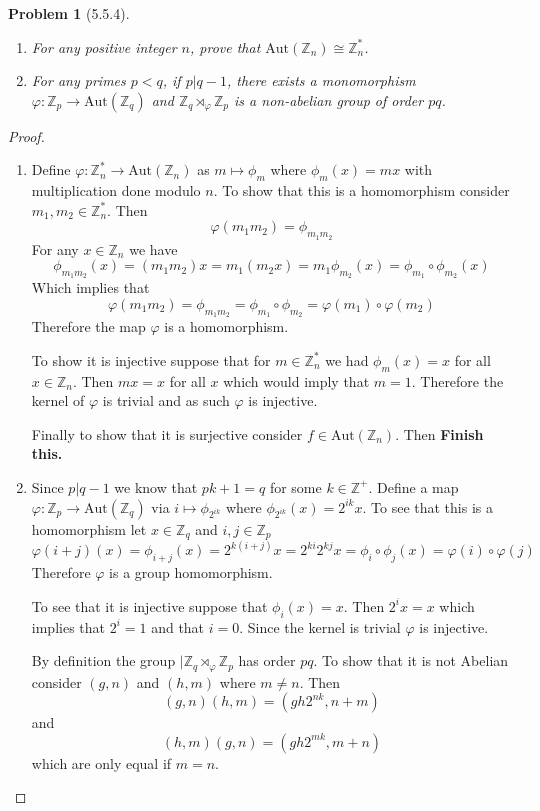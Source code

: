 \documentclass[10pt]{article}
\newcommand{\sk}{\vskip 10mm}
\newcommand{\bb}[1]{\mathbb{#1}}
\theoremstyle{plain}
\newtheorem{problem}{Problem}
\theoremstyle{remark}
\begin{document}
\sk

\begin{problem}[5.5.4]
  \begin{enumerate}
  \item[(a)] For any positive integer $n$, prove that $\text{Aut}(\bb{Z}_n)\cong \bb{Z}_n^*$.
  \item[(b)] For any primes $p<q$, if $p|q-1$, there exists a monomorphism
    $\varphi:\bb{Z}_p\rightarrow \text{Aut}(\bb{Z}_q)$ and $\bb{Z}_q\rtimes_\varphi \bb{Z}_p$ is a non-abelian
    group of order $pq$.
  \end{enumerate}
\end{problem}

\begin{proof}
  \begin{enumerate}
  \item[(a)] Define $\varphi:\bb{Z}_n^*\rightarrow \text{Aut}(\bb{Z}_n)$ as $m\mapsto \phi_m$ where $\phi_m(x)=mx$
    with multiplication done modulo $n$. To show that this is a homomorphism
    consider $m_1,m_2\in\bb{Z}_n^*$. Then
    \[ \varphi(m_1m_2)= \phi_{m_1m_2}\]
    For any $x\in \bb{Z}_n$ we have
    \[ \phi_{m_1m_2}(x)=(m_1m_2)x=m_1(m_2x)=m_1\phi_{m_2}(x)=\phi_{m_1}\circ\phi_{m_2}(x) \]
    Which implies that
    \[ \varphi(m_1m_2)=\phi_{m_1m_2}=\phi_{m_1}\circ\phi_{m_2}=\varphi(m_1)\circ\varphi(m_2) \]
    Therefore the map $\varphi$ is a homomorphism.

    To show it is injective suppose that for $m\in\bb{Z}_n^*$ we had
    $\phi_m(x)=x$ for all $x\in\bb{Z}_n$. Then $mx=x$ for
    all $x$ which would imply that $m=1$. Therefore the kernel
    of $\varphi$ is trivial and as such $\varphi$ is injective.

    Finally to show that it is surjective consider $f\in \text{Aut}(\bb{Z}_n)$. Then
    \textbf{Finish this.}
  \item[(b)] Since $p|q-1$ we know that $pk+1=q$ for some
    $k\in\bb{Z}^+$. Define a map $\varphi:\bb{Z}_p\rightarrow \text{Aut}(\bb{Z}_q)$ via
    $i\mapsto \phi_{2^{ik}}$ where $\phi_{2^{ik}}(x)=2^{ik}x$. To see that this is a
    homomorphism let $x\in \bb{Z}_q$ and $i,j\in \bb{Z}_p$
    \[ \varphi(i+j)(x)=\phi_{i+j}(x)=2^{k(i+j)}x=2^{ki}2^{kj}x=\phi_{i}\circ\phi_j(x)=\varphi(i)\circ\varphi(j) \]
    Therefore $\varphi$ is a group homomorphism.

    To see that it is injective suppose that $\phi_i(x)=x$. Then
    $2^ix=x$ which implies that $2^i=1$ and that $i=0$. Since
    the kernel is trivial $\varphi$ is injective.

    By definition the group $|\bb{Z}_q\rtimes_\varphi\bb{Z}_p$ has order $pq$.
    To show that it is not Abelian consider $(g,n)$ and $(h,m)$ where
    $m\neq n$. Then
    \[ (g,n)(h,m)=(gh2^{nk},n+m)\]
    and
    \[ (h,m)(g,n)=(gh2^{mk},m+n)\]
    which are only equal if $m=n$.
  \end{enumerate}
\end{proof}
\end{document}

